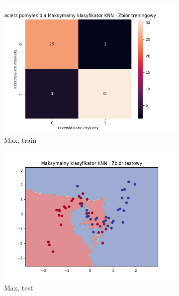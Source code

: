 \documentclass[12pt]{article}
\newcommand*{\subfigwidth}{0.24\textwidth}
\begin{document}
\begin{figure}[H]
\begin{subfigure}[t]{\subfigwidth}
        \includegraphics[width=\linewidth]{img/exp_3/knn/2_3/max/train_matrix.png}
        \caption{Max, train}
    \end{subfigure}
    \hfill
    \begin{subfigure}[t]{\subfigwidth}
        \includegraphics[width=\linewidth]{img/exp_3/knn/2_3/max/test_boundary.png}
        \caption{Max, test}
    \end{subfigure}
    \hfill
    \begin{subfigure}[t]{\subfigwidth}

\end{subfigure}
\end{figure}
\end{document}
